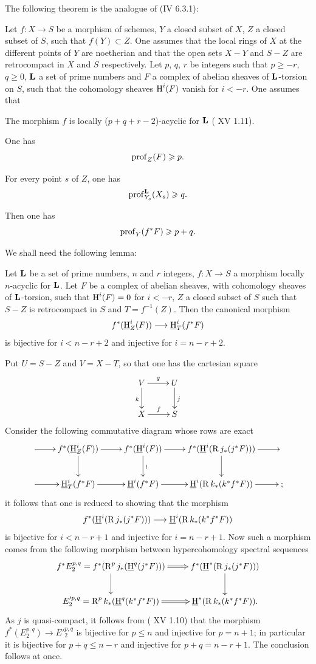 The following theorem is the analogue of (\EGA IV 6.3.1):

\begin{theorem} \label{XIV.1.13}
Let $f:X\to S$ be a morphism of schemes, $Y$ a closed subset of $X$, $Z$ a closed subset of $S$, such that $f(Y)\subset Z$. One assumes that the local rings of $X$ at the different points of $Y$ are noetherian and that the open sets $X-Y$ and $S-Z$ are retrocompact in $X$ and $S$ respectively. Let $p$, $q$, $r$ be integers such that $p\geq -r$, $q\geq 0$, $\mathbf{L}$ a set of prime numbers and $F$ a complex of abelian sheaves of $\mathbf{L}$-torsion on $S$, such that the cohomology sheaves $\operatorname{H}^i(F)$ vanish for $i<-r$. One assumes that
\begin{enumeratea}
\item
The morphism $f$ is locally ($p+q+r-2$)-acyclic for $\mathbf{L}$ \textup{( XV 1.11)}.
\item
One has
$$
\operatorname{prof}_Z(F)\geqslant p.
$$
\item
For every point $s$ of $Z$, one has
$$
\operatorname{prof}_{Y_s}^{\mathbf{L}}(X_s)\geqslant q.
$$
\end{enumeratea}
\noindent
Then one has
$$
\operatorname{prof}_Y(f^*F)\geqslant p+q.
$$
\end{theorem}

We shall need the following lemma:

\begin{sublemma} \label{XIV.1.13.1}
Let $\mathbf{L}$ be a set of prime numbers, $n$ and $r$ integers, $f:X\to S$ a morphism locally $n$-acyclic for $\mathbf{L}$. Let $F$ be a complex of abelian sheaves, with cohomology sheaves of $\mathbf{L}$-torsion, such that $\operatorname{H}^i(F)=0$ for $i<-r$, $Z$ a closed subset of $S$ such that $S-Z$ is retrocompact in $S$ and $T=f^{-1}(Z)$. Then the canonical morphism
$$f^*({\h}_Z^i(F))\to {\h}_T^i(f^*F)$$
is bijective for $i<n-r+2$ and injective for $i=n-r+2$.
\end{sublemma}

Put $U=S-Z$ and $V=X-T$, so that one has the cartesian square
$$
\xymatrix{
V \ar[r]^-g\ar[d]_k& U\ar[d]^j\\
X \ar[r]^-f&S
}$$
Consider the following commutative diagram whose rows are exact
$$
\xymatrix{ \ar[r]&f^*({\h}_Z^i(F))\ar[r]\ar[d]& f^*({\h}^i(F))\ar[r]\ar[d]^{\wr} &f^*({\h}^i(\R j_*(j^*F)))\ar[r]\ar[d]& \\
\ar[r] &{\h}_T^i(f^*F)\ar[r]& {\h}^i(f^*F) \ar[r]&{\h}^i(\R k_*(k^*f^*F)) \ar[r]&\text{;}}$$
it follows that one is reduced to showing that the morphism
$$f^*({\h}^i(\R j_*(j^*F)))\to {\h}^i(\R k_*(k^*f^*F))$$
is bijective for $i<n-r+1$ and injective for $i=n-r+1$. Now such a morphism comes from the following morphism between hypercohomology spectral sequences
$$
\xymatrix{f^*E_2^{p, q}=f^*(\R^pj_*({\h}^q(j^*F)))\ar@{=>} [r]\ar[d]&f^*({\h}^*(\R j_*(j^*F)))\ar[d]\\
E'^{p, q}_2=\R^pk_*({\h}^q(k^*f^*F))\ar@{=>}[r]&{\h}^*(\R k_*(k^*f^*F)).}
$$
As $j$ is quasi-compact, it follows from ( XV 1.10) that the morphism $f^*(E^{p, q}_2)\to E'^{p, q}_2$ is bijective for $p\leq n$ and injective for $p=n+1$; in particular it is bijective for $p+q\leq n-r$ and injective for $p+q=n-r+1$. The conclusion follows at once.

